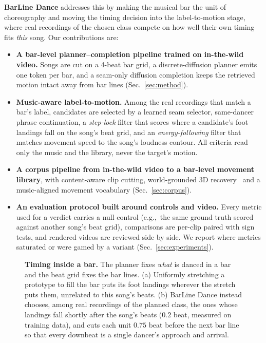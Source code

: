 \documentclass[10pt]{article}
\newcommand{\eg}{e.g.,\ }
\begin{document}
\textbf{BarLine Dance} addresses this by making the musical bar the unit of choreography and moving the timing decision into the label-to-motion stage, where real recordings of the chosen class compete on how well their own timing fits \emph{this} song.
Our contributions are:
\begin{itemize}
  \item \textbf{A bar-level planner--completion pipeline trained on in-the-wild video.} Songs are cut on a 4-beat bar grid, a discrete-diffusion planner emits one token per bar, and a seam-only diffusion completion keeps the retrieved motion intact away from bar lines (Sec.~\ref{sec:method}).
  \item \textbf{Music-aware label-to-motion.} Among the real recordings that match a bar's label, candidates are selected by a learned seam selector, same-dancer phrase continuation, a \emph{step-lock} filter that scores where a candidate's foot landings fall on the song's beat grid, and an \emph{energy-following} filter that matches movement speed to the song's loudness contour. All criteria read only the music and the library, never the target's motion.
  \item \textbf{A corpus pipeline from in-the-wild video to a bar-level movement library}, with content-aware clip cutting, world-grounded 3D recovery~\cite{shen2024gvhmr} and a music-aligned movement vocabulary (Sec.~\ref{sec:corpus}).
  \item \textbf{An evaluation protocol built around controls and video.} Every metric used for a verdict carries a null control (\eg the same ground truth scored against another song's beat grid), comparisons are per-clip paired with sign tests, and rendered videos are reviewed side by side. We report where metrics saturated or were gamed by a variant (Sec.~\ref{sec:experiments}).
\end{itemize}

\begin{figure}[t]
  \centering
  \resizebox{0.86\linewidth}{!}{}
  \caption{\textbf{Timing inside a bar.} The planner fixes \emph{what} is danced in a bar and the beat grid fixes the bar lines. (a) Uniformly stretching a prototype to fill the bar puts its foot landings wherever the stretch puts them, unrelated to this song's beats. (b) BarLine Dance instead chooses, among real recordings of the planned class, the ones whose landings fall shortly after the song's beats ($0.2$ beat, measured on training data), and cuts each unit $0.75$ beat before the next bar line so that every downbeat is a single dancer's approach and arrival.}
  \label{fig:schematic}
\end{figure}
\end{document}
